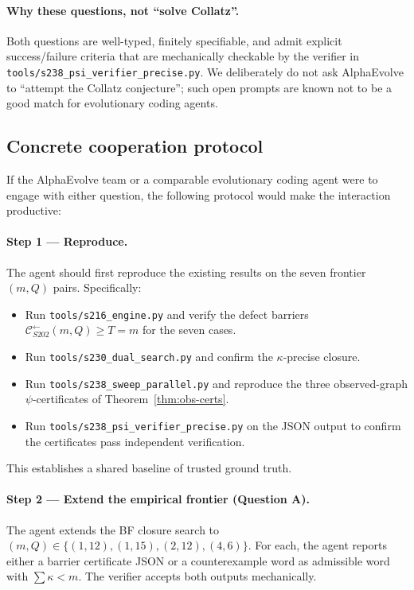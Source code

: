 \documentclass[11pt,a4paper]{article}
\theoremstyle{plain}
\theoremstyle{definition}
\newcommand{\Cback}{\mathcal{C}^{\!\leftarrow}_{S202}}
\begin{document}
\paragraph{Why these questions, not ``solve Collatz''.}
Both questions are well-typed, finitely specifiable, and admit
explicit success/failure criteria that are mechanically
checkable by the verifier in
\texttt{tools/s238\_psi\_verifier\_precise.py}. We deliberately
do not ask AlphaEvolve to ``attempt the Collatz conjecture'';
such open prompts are known not to be a good match for
evolutionary coding agents.

\subsection{Concrete cooperation protocol}

If the AlphaEvolve team or a comparable evolutionary coding agent
were to engage with either question, the following protocol would
make the interaction productive:

\paragraph{Step 1 — Reproduce.}
The agent should first reproduce the existing results on the
seven frontier $(m, Q)$ pairs. Specifically:
\begin{itemize}
   \item Run \texttt{tools/s216\_engine.py} and verify the defect
         barriers $\Cback(m, Q) \ge T = m$ for the seven cases.
   \item Run \texttt{tools/s230\_dual\_search.py} and confirm
         the $\kappa$-precise closure.
   \item Run \texttt{tools/s238\_sweep\_parallel.py} and reproduce
         the three observed-graph $\psi$-certificates of
         Theorem~\ref{thm:obs-certs}.
   \item Run \texttt{tools/s238\_psi\_verifier\_precise.py} on the
         JSON output to confirm the certificates pass independent
         verification.
\end{itemize}
This establishes a shared baseline of trusted ground truth.

\paragraph{Step 2 — Extend the empirical frontier (Question A).}
The agent extends the BF closure search to $(m, Q) \in
\{(1, 12), (1, 15), (2, 12), (4, 6)\}$. For each, the agent reports
either a barrier certificate JSON or a counterexample word as
admissible word with $\sum \kappa < m$. The verifier accepts both
outputs mechanically.
\end{document}
